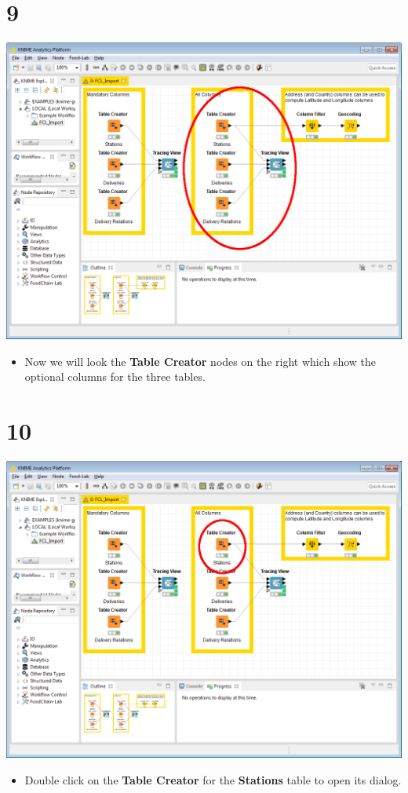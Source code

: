 \documentclass[10pt]{beamer}
\begin{document}
\section{9}
\begin{frame}
	\begin{center}
  		\includegraphics[height=0.6\textheight]{9.png}
	\end{center}
	\begin{itemize}
		\item Now we will look the \textbf{Table Creator} nodes on the right which show the optional columns for the three tables.
	\end{itemize}
\end{frame}

\section{10}
\begin{frame}
	\begin{center}
  		\includegraphics[height=0.6\textheight]{10.png}
	\end{center}
	\begin{itemize}
		\item Double click on the \textbf{Table Creator} for the \textbf{Stations} table to open its dialog.
	\end{itemize}
\end{frame}
\end{document}
